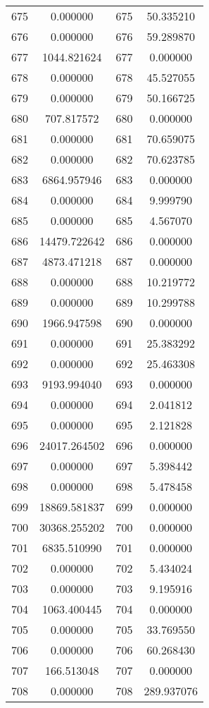 \documentclass[12pt]{article}
\begin{document}
\begin{longtable}{@{}cccc@{}}
675 & 0.000000 & 675 & 50.335210 \\
676 & 0.000000 & 676 & 59.289870 \\
677 & 1044.821624 & 677 & 0.000000 \\
678 & 0.000000 & 678 & 45.527055 \\
679 & 0.000000 & 679 & 50.166725 \\
680 & 707.817572 & 680 & 0.000000 \\
681 & 0.000000 & 681 & 70.659075 \\
682 & 0.000000 & 682 & 70.623785 \\
683 & 6864.957946 & 683 & 0.000000 \\
684 & 0.000000 & 684 & 9.999790 \\
685 & 0.000000 & 685 & 4.567070 \\
686 & 14479.722642 & 686 & 0.000000 \\
687 & 4873.471218 & 687 & 0.000000 \\
688 & 0.000000 & 688 & 10.219772 \\
689 & 0.000000 & 689 & 10.299788 \\
690 & 1966.947598 & 690 & 0.000000 \\
691 & 0.000000 & 691 & 25.383292 \\
692 & 0.000000 & 692 & 25.463308 \\
693 & 9193.994040 & 693 & 0.000000 \\
694 & 0.000000 & 694 & 2.041812 \\
695 & 0.000000 & 695 & 2.121828 \\
696 & 24017.264502 & 696 & 0.000000 \\
697 & 0.000000 & 697 & 5.398442 \\
698 & 0.000000 & 698 & 5.478458 \\
699 & 18869.581837 & 699 & 0.000000 \\
700 & 30368.255202 & 700 & 0.000000 \\
701 & 6835.510990 & 701 & 0.000000 \\
702 & 0.000000 & 702 & 5.434024 \\
703 & 0.000000 & 703 & 9.195916 \\
704 & 1063.400445 & 704 & 0.000000 \\
705 & 0.000000 & 705 & 33.769550 \\
706 & 0.000000 & 706 & 60.268430 \\
707 & 166.513048 & 707 & 0.000000 \\
708 & 0.000000 & 708 & 289.937076 \\

\end{longtable}
\end{document}
